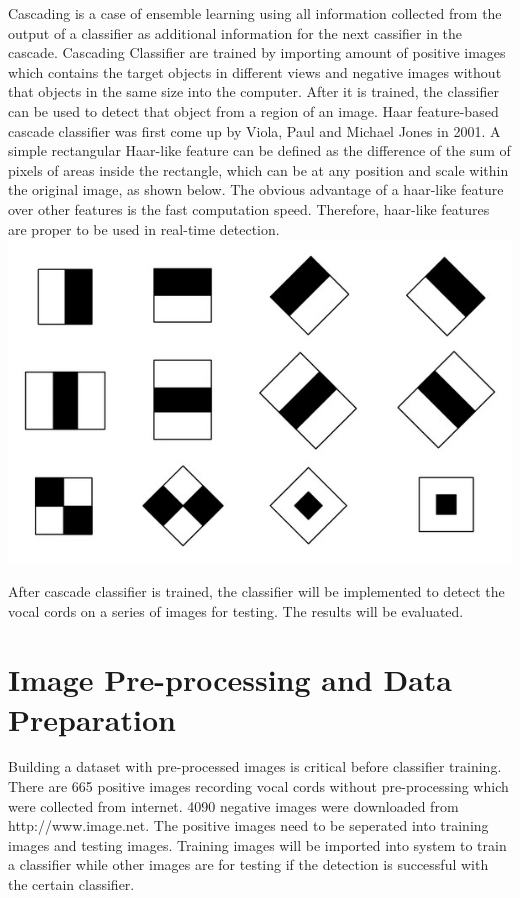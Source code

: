 \documentclass[11pt]{article}
\makeatletter
\def\maxwidth{\ifdim\Gin@nat@width>\linewidth\linewidth
    \else\Gin@nat@width\fi}
\let\Oldincludegraphics\includegraphics
\renewcommand{\includegraphics}[1]{\Oldincludegraphics[width=.8\maxwidth]{#1}}
\makeatother
\begin{document}
Cascading is a case of ensemble learning using all information collected
from the output of a classifier as additional information for the next
cassifier in the cascade. Cascading Classifier are trained by importing
amount of positive images which contains the target objects in different
views and negative images without that objects in the same size into the
computer. After it is trained, the classifier can be used to detect that
object from a region of an image. Haar feature-based cascade classifier
was first come up by Viola, Paul and Michael Jones in 2001. A simple
rectangular Haar-like feature can be defined as the difference of the
sum of pixels of areas inside the rectangle, which can be at any
position and scale within the original image, as shown below. The
obvious advantage of a haar-like feature over other features is the fast
computation speed. Therefore, haar-like features are proper to be used
in real-time detection. \includegraphics{haar.png}

After cascade classifier is trained, the classifier will be implemented
to detect the vocal cords on a series of images for testing. The results
will be evaluated.

    \hypertarget{image-pre-processing-and-data-preparation}{%
\section{Image Pre-processing and Data
Preparation}\label{image-pre-processing-and-data-preparation}}

    Building a dataset with pre-processed images is critical before
classifier training. There are 665 positive images recording vocal cords
without pre-processing which were collected from internet. 4090 negative
images were downloaded from http://www.image.net. The positive images
need to be seperated into training images and testing images. Training
images will be imported into system to train a classifier while other
images are for testing if the detection is successful with the certain
classifier.
\end{document}

